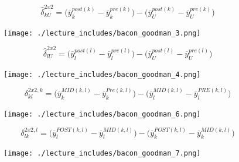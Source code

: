\documentclass{beamer}
\begin{document}



\begin{frame}[plain]
$$\widehat{\delta}^{2x2}_{kU} = \bigg ( \overline{y}_k^{post(k)} - \overline{y}_k^{pre(k)} \bigg ) - \bigg ( \overline{y}_U^{post(k)} - \overline{y}_U^{pre(k)} \bigg ) $$
	\begin{figure}
	\texttt{[image: ./lecture\_includes/bacon\_goodman\_3.png]}
	\end{figure}

\end{frame}

\begin{frame}[plain]
$$\widehat{\delta}^{2x2}_{lU} = \bigg ( \overline{y}_l^{post(l)} - \overline{y}_l^{pre(l)} \bigg ) - \bigg ( \overline{y}_U^{post(l)} - \overline{y}_U^{pre(l)} \bigg ) $$
	\begin{figure}
	\texttt{[image: ./lecture\_includes/bacon\_goodman\_4.png]}
	\end{figure}

\end{frame}


\begin{frame}[plain]

$$\delta_{kl}^{2x2,k} = \bigg ( \overline{y}_k^{MID(k,l)} - \overline{y}_k^{Pre(k,l)} \bigg ) - \bigg ( \overline{y}_l^{MID(k,l)} - \overline{y}_l^{PRE(k,l)} \bigg ) $$

	\begin{figure}
	\texttt{[image: ./lecture\_includes/bacon\_goodman\_6.png]}
	\end{figure}

\end{frame}

\begin{frame}[plain]
$$\delta_{lk}^{2x2,l} = \bigg ( \overline{y}_l^{POST(k,l)} - \overline{y}_l^{MID(k,l)} \bigg ) - \bigg ( \overline{y}_k^{POST(k,l)} - \overline{y}_k^{MID(k,l)} \bigg ) $$

	\begin{figure}
	\texttt{[image: ./lecture\_includes/bacon\_goodman\_7.png]}
	\end{figure}

\end{frame}


\end{document}
